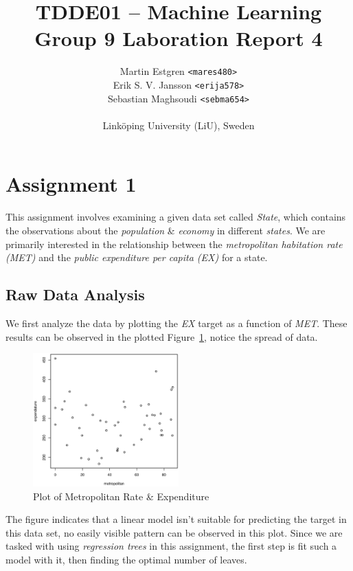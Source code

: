 \documentclass[a4paper, twocolumn]{article}
\title{TDDE01 -- Machine Learning \\
       Group 9 Laboration Report 4}
\author{{Martin Estgren \texttt{<mares480>}} \\
        {Erik S. V. Jansson \texttt{<erija578>}} \\
        {Sebastian Maghsoudi \texttt{<sebma654>}} \\~\\
        {Linköping University (LiU), Sweden}}
\begin{document}
    \maketitle %

    \section*{Assignment 1}

        This assignment involves examining a given data set called \emph{State}, which contains the observations about the \emph{population} \& \emph{economy} in different \emph{states}. We are primarily interested in the relationship between the \emph{metropolitan habitation rate (MET)} and the \emph{public expenditure per capita (EX)} for a state.

    \subsection*{Raw Data Analysis}

        We first analyze the data by plotting the \emph{EX} target as a function of \emph{MET}. These results can be observed in the plotted Figure~\ref{fig:state}, notice the spread of data.

        \begin{figure}[h!]
            \centering
            \caption{Plot of Metropolitan Rate \& Expenditure}
            \label{fig:state}
            \includegraphics[width=0.5\textwidth]{share/A1_data.eps}
        \end{figure}

        The figure indicates that a linear model isn't suitable for predicting the target in this data set, no easily visible pattern can be observed in this plot. Since we are tasked with using \emph{regression trees} in this assignment, the first step is fit such a model with it, then finding the optimal number of leaves.
\end{document}
